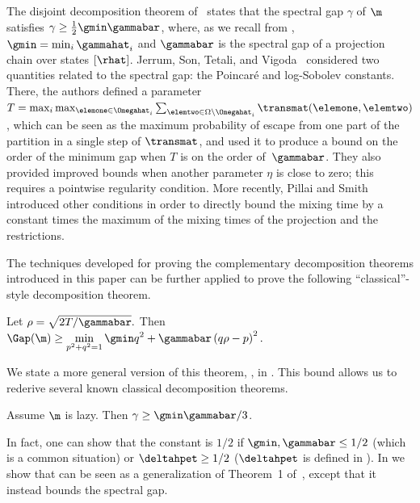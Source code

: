 The disjoint decomposition theorem of~\cite{MR00} states that the 
spectral gap $\gamma$ of $\m$ satisfies $\gamma \geq 
\frac{1}{2}\gmin\gammabar$, where, as we recall from 
, $\gmin=\min_i \gammahat_i$ and $\gammabar$ is 
the spectral gap of a projection chain over states $[\rhat]$. Jerrum, 
Son, Tetali, and Vigoda~\cite{jstv04} considered two quantities related 
to the spectral gap: the Poincar\'{e} and log-Sobolev constants.  
There, the authors defined a parameter 
$T=\max_i\max_{\elemone\in\Omegahat_i}\sum_{\elemtwo\in 
\Omega\setminus\Omegahat_i}\transmat(\elemone,\elemtwo)$, which can be 
seen as the maximum probability of escape from one part of the 
partition in a single step of $\transmat$, and used it to produce a 
bound on the order of the minimum gap
when $T$ is on the order of~$\gammabar$.  They also provided 
improved bounds when another parameter $\eta$ is close to zero; this 
requires a pointwise regularity condition. More recently, Pillai and 
Smith~\cite{PS17} introduced other conditions in order to directly 
bound the mixing time by a constant times the maximum of the mixing 
times of the projection and the restrictions.

The techniques developed for proving the complementary decomposition 
theorems introduced in this paper can be further applied to prove the 
following ``classical''-style decomposition theorem.

\begin{theorem}\label{thm:main}
  Let $\rho=\sqrt{2T/\gammabar}.$ Then   $\Gap(\m)\geq \displaystyle\min_{p^2+q^2=1}
\gmin q^2+\gammabar\left(q\rho - p\right)^2.$
%
\end{theorem}
\noindent
 We state a more general version of this theorem, , in
.
This bound allows us to rederive several known classical
decomposition theorems.

\begin{corollary}\label{cor:compareproduct}
  Assume $\m$ is lazy.  Then $\gamma\geq \gmin\gammabar/3$.
\end{corollary}
\noindent In fact, one can show that the constant is $1/2$ if $\gmin,\gammabar\leq 1/2$ (which is a common situation) or $\deltahpet\geq 1/2$ ($\deltahpet$ is defined in ).
In  we show that 
can be seen as a generalization of Theorem~1 of~\cite{jstv04}, except
that it instead bounds the spectral gap.

